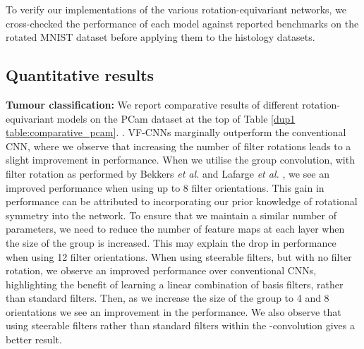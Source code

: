 \documentclass[journal]{IEEEtran}
\newcommand\mg[1]{{\color{black}{#1}}}
\begin{document}
	    To verify our implementations of the various rotation-equivariant networks, we cross-checked the performance of each model against reported benchmarks on the rotated MNIST dataset \cite{larochelle2007empirical} before applying them to the histology datasets. \mg{These results are summarised in Table \ref{dup1 table:comparative_rotmnist}.}
	 
	    \subsection{Quantitative results} \label{dup1 section:comparison_results}
	   
	    \textbf{Tumour classification: }We report comparative results of different rotation-equivariant models on the PCam dataset at the top of Table \ref{dup1 table:comparative_pcam}. \mg{We observe that H-Nets do not perform as well as the baseline CNN for the task of tumour classification. Despite this, we observe that we are able to increase the performance when incorporating higher frequency filters in the network, but the performance is still not comparable to conventional CNNs. This may suggest that constraining the filters in this way may not be optimal for detecting complex features in histology}. VF-CNNs marginally outperform the conventional CNN, where we observe that increasing the number of filter rotations leads to a slight improvement in performance. When we utilise the group convolution, with filter rotation as performed by Bekkers \textit{et al.} \cite{bekkers2018roto} and Lafarge \textit{et al.} \cite{lafarge2020roto}, we see an improved performance when using up to 8 filter orientations. This gain in performance can be attributed to incorporating our prior knowledge of rotational symmetry into the network. To ensure that we maintain a similar number of parameters, we need to reduce the number of feature maps at each layer when the size of the group is increased. This may explain the drop in performance when using 12 filter orientations. When using steerable filters, but with no filter rotation, we observe an improved performance over conventional CNNs, highlighting the benefit of learning a linear combination of basis filters, rather than standard filters. Then, as we increase the size of the group to 4 and 8 orientations we see an improvement in the performance. We also observe that using steerable filters rather than standard filters within the -convolution gives a better result. 
	    
\end{document}
